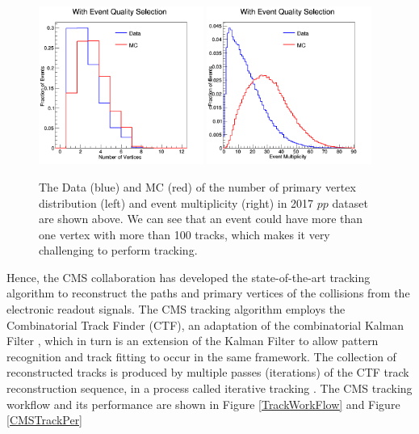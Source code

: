 \begin{figure}[hbtp]
\begin{center}
\includegraphics[width=0.48\textwidth]{Figures/Chapter4/Vertex.png}
\includegraphics[width=0.48\textwidth]{Figures/Chapter4/Multiplicity.png}
\caption{The Data (blue) and MC (red) of the number of primary vertex distribution (left) and event multiplicity (right) in 2017 $pp$ dataset are shown above. We can see that an event could have more than one vertex with more than 100 tracks, which makes it very challenging to perform tracking.}
\label{CMSEvtInfo}
\end{center}
\end{figure} 

Hence, the CMS collaboration has developed the state-of-the-art tracking algorithm to reconstruct the paths and primary vertices of the collisions from the electronic readout signals. The CMS tracking algorithm employs the Combinatorial Track Finder (CTF), an adaptation of the combinatorial Kalman Filter \cite{CMSTrack1,CMSTrack2,CMSTrack3}, which in turn is an extension of the Kalman Filter \cite{Kalman} to allow pattern recognition and track fitting to occur in the same framework. The collection of reconstructed tracks is produced by multiple passes (iterations) of the CTF track reconstruction sequence, in a process called iterative tracking \cite{CMSTrackComp}. The CMS tracking workflow and its performance are shown in Figure \ref{TrackWorkFlow} and Figure \ref{CMSTrackPer}



